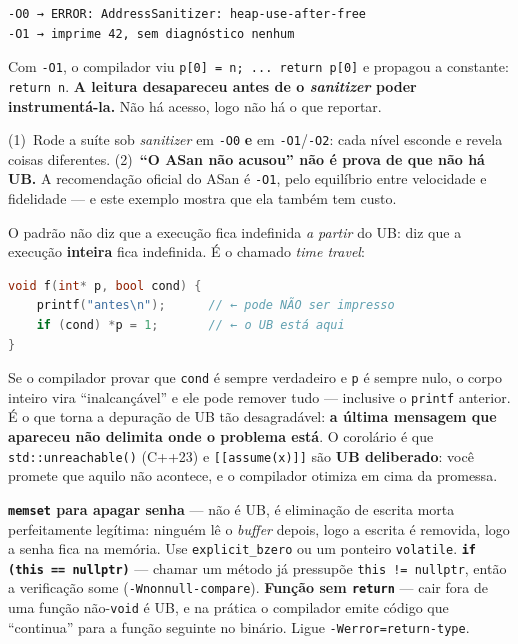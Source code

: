 \begin{lstlisting}[style=bt, language=bash,
    caption={Medido em \texttt{src/undefined\_behavior/} com
             \texttt{-fsanitize=address}: o MESMO código, dois níveis.}]
-O0 → ERROR: AddressSanitizer: heap-use-after-free
-O1 → imprime 42, sem diagnóstico nenhum
\end{lstlisting}

Com \texttt{-O1}, o compilador viu \texttt{p[0] = n; ... return p[0]} e propagou
a constante: \texttt{return n}. \textbf{A leitura desapareceu antes de o
\emph{sanitizer} poder instrumentá-la.} Não há acesso, logo não há o que
reportar.

\begin{regra}
(1)~Rode a suíte sob \emph{sanitizer} em \texttt{-O0} \textbf{e} em
\texttt{-O1}/\texttt{-O2}: cada nível esconde e revela coisas diferentes.
(2)~\textbf{``O ASan não acusou'' não é prova de que não há UB.} A recomendação
oficial do ASan é \texttt{-O1}, pelo equilíbrio entre velocidade e fidelidade ---
e este exemplo mostra que ela também tem custo.
\end{regra}

O padrão não diz que a execução fica indefinida \emph{a partir} do UB: diz que a
execução \textbf{inteira} fica indefinida. É o chamado \emph{time travel}:

\begin{lstlisting}[style=bt, language=C++,
    caption={O efeito que aparece antes da causa.}]
void f(int* p, bool cond) {
    printf("antes\n");      // ← pode NÃO ser impresso
    if (cond) *p = 1;       // ← o UB está aqui
}
\end{lstlisting}

Se o compilador provar que \texttt{cond} é sempre verdadeiro e \texttt{p} é
sempre nulo, o corpo inteiro vira ``inalcançável'' e ele pode remover tudo ---
inclusive o \texttt{printf} anterior. É o que torna a depuração de UB tão
desagradável: \textbf{a última mensagem que apareceu não delimita onde o problema
está}. O corolário é que \texttt{std::unreachable()} (C++23) e
\texttt{[[assume(x)]]} são \textbf{UB deliberado}: você promete que aquilo não
acontece, e o compilador otimiza em cima da promessa.

\begin{armadilha}
\textbf{\texttt{memset} para apagar senha} --- não é UB, é eliminação de escrita
morta perfeitamente legítima: ninguém lê o \emph{buffer} depois, logo a escrita é
removida, logo a senha fica na memória. Use \texttt{explicit\_bzero} ou um
ponteiro \texttt{volatile}.
\textbf{\texttt{if (this == nullptr)}} --- chamar um método já pressupõe
\texttt{this != nullptr}, então a verificação some
(\texttt{-Wnonnull-compare}).
\textbf{Função sem \texttt{return}} --- cair fora de uma função não-\texttt{void}
é UB, e na prática o compilador emite código que ``continua'' para a função
seguinte no binário. Ligue \texttt{-Werror=return-type}.
\end{armadilha}

